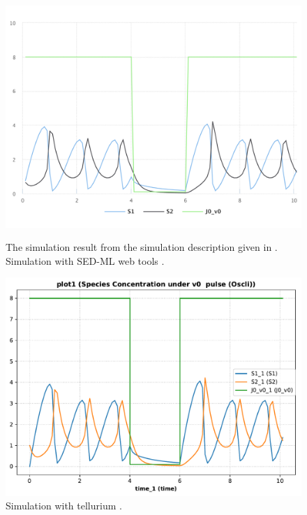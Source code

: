 \begin{figure}[ht]
    \centering
    \begin{minipage}{0.47\textwidth}
        \centering
        \includegraphics[width=1.0\textwidth]{examples/oscli-nested-pulse/results/sedml_webtools/plot1}
        \caption{The simulation result from the simulation description given in . Simulation with SED-ML web tools \citep{bergmann2017sed}.}
    \end{minipage}\hfill
    \begin{minipage}{0.47\textwidth}
        \centering
        \includegraphics[width=1.0\textwidth]{examples/oscli-nested-pulse/results/tellurium/plot1}
        \caption{Simulation with tellurium \citep{tellurium}.}
    \end{minipage}
    \label{fig:oscli-nested-pulse}
\end{figure}

